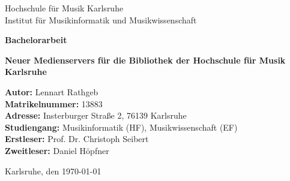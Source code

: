 \documentclass[12pt,a4paper]{report}
\begin{document}
\begin{titlepage}
    \centering
    {\Large Hochschule für Musik Karlsruhe \\[1em]}
    {\large Institut für Musikinformatik und Musikwissenschaft \\[6em]}

    {\Large \textbf{Bachelorarbeit} \\[2em]}

    {\LARGE \textbf{Neuer Medienservers für die Bibliothek der Hochschule für Musik Karlsruhe} \\[6em]}

    \begin{minipage}{0.9\textwidth}
        \raggedright
        \textbf{Autor:} Lennart Rathgeb \\
        \textbf{Matrikelnummer:} 13883 \\
        \textbf{Adresse:} Insterburger Straße 2, 76139 Karlsruhe \\
        \textbf{Studiengang:} Musikinformatik (HF), Musikwissenschaft (EF) \\
        \textbf{Erstleser:} Prof. Dr. Christoph Seibert \\
        \textbf{Zweitleser:} Daniel Höpfner \\
    \end{minipage}

    \vfill
    Karlsruhe, den \today
\end{titlepage}

\cleardoublepage
{}
\tableofcontents

\cleardoublepage
\listoffigures
{}

\end{document}
